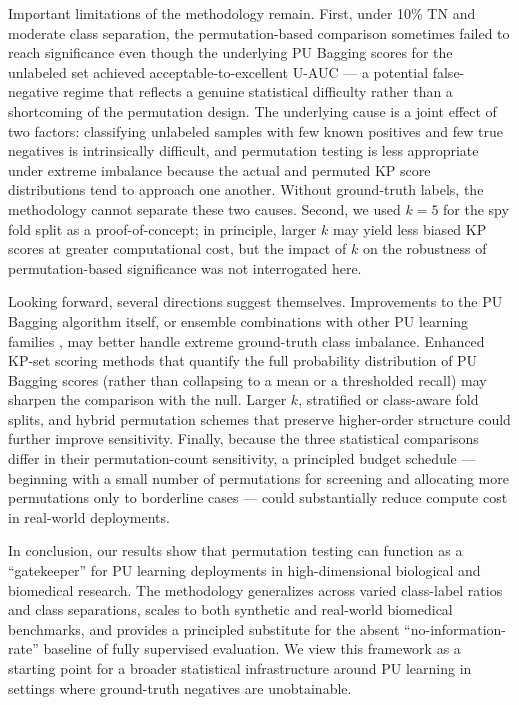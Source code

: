 \documentclass[11pt]{article}
\begin{document}
Important limitations of the methodology remain. First, under 10\% TN and moderate class separation, the permutation-based comparison sometimes failed to reach significance even though the underlying PU Bagging scores for the unlabeled set achieved acceptable-to-excellent U-AUC --- a potential false-negative regime that reflects a genuine statistical difficulty rather than a shortcoming of the permutation design. The underlying cause is a joint effect of two factors: classifying unlabeled samples with few known positives and few true negatives is intrinsically difficult, and permutation testing is less appropriate under extreme imbalance because the actual and permuted KP score distributions tend to approach one another. Without ground-truth labels, the methodology cannot separate these two causes. Second, we used $k = 5$ for the spy fold split as a proof-of-concept; in principle, larger $k$ may yield less biased KP scores at greater computational cost, but the impact of $k$ on the robustness of permutation-based significance was not interrogated here.

Looking forward, several directions suggest themselves. Improvements to the PU Bagging algorithm itself, or ensemble combinations with other PU learning families \cite{yang2014epu,wang2019nsemda,li2019protease}, may better handle extreme ground-truth class imbalance. Enhanced KP-set scoring methods that quantify the full probability distribution of PU Bagging scores (rather than collapsing to a mean or a thresholded recall) may sharpen the comparison with the null. Larger $k$, stratified or class-aware fold splits, and hybrid permutation schemes that preserve higher-order structure could further improve sensitivity. Finally, because the three statistical comparisons differ in their permutation-count sensitivity, a principled budget schedule --- beginning with a small number of permutations for screening and allocating more permutations only to borderline cases --- could substantially reduce compute cost in real-world deployments.

In conclusion, our results show that permutation testing can function as a ``gatekeeper'' for PU learning deployments in high-dimensional biological and biomedical research. The methodology generalizes across varied class-label ratios and class separations, scales to both synthetic and real-world biomedical benchmarks, and provides a principled substitute for the absent ``no-information-rate'' baseline of fully supervised evaluation. We view this framework as a starting point for a broader statistical infrastructure around PU learning in settings where ground-truth negatives are unobtainable.
\end{document}
